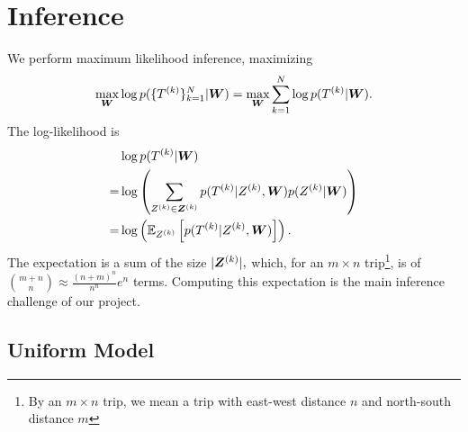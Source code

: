 \documentclass{article}
\begin{document}


\section{Inference}
\label{sec:inference}
We perform maximum likelihood inference, maximizing \[
\max_{\bm W} \log p(\{T^{(k)}\}_{k=1}^N|\bm W) = \max_{\bm W} \sum_{k=1}^N \log p(T^{(k)} | \bm W).
\]
The log-likelihood is 
\begin{align*}
&\log p (T^{(k)} | \bm W) \\
=& \log\left({\sum_{Z^{(k)} \in \bm Z^{(k)}} p(T^{(k)}|Z^{(k)},\bm W)p(Z^{(k)}|\bm W)}\right) \\
=& \log\left({\mathbb{E}_{Z^{(k)}}\left[{p(T^{(k)}|Z^{(k)},\bm W)}\right]}\right).
\end{align*}
The expectation is a sum of the size $|\bm Z^{(k)}|,$ which, for an $m\times n$ trip\footnote{By an $m\times n$ trip, we mean a trip with east-west distance $n$ and north-south distance $m$}, is of $\binom{m+n}{n} \approx \frac{(n+m)^n}{n^n}e^n$ terms. Computing this expectation is the main inference challenge of our project.

\subsection{Uniform Model}
\end{document}
